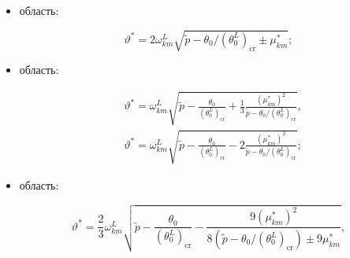 \begin{itemize}

\item[I] область:

\begin{equation}\label{eq:myl:f27}

\vartheta^*=2 \omega_{km}^L\sqrt{\widetilde{p}-{\theta_0}/{(\theta_0^L)_{\text{cr}}}\pm \mu_{km}^*};

\end{equation}



\item[II] область:



\begin{equation}\label{eq:myl:f28}

\begin{split}

& \vartheta^*=\omega_{km}^L\sqrt{\widetilde{p}-\frac{\theta_0}{(\theta_0^L)_{\text{cr}}}+

\frac13\frac{(\mu_{km}^*)^2}{\widetilde{p}-{ \theta_0}/{(\theta_0^L)_{\text{cr}}}}}, \\

& \vartheta^*=\omega_{km}^L\sqrt{\widetilde{p}-\frac{\theta_0}{(\theta_0^L)_{\text{cr}}}-

2 \frac{ (\mu_{km}^*)^2}{\widetilde{p}-{\theta_0}/{(\theta_0^L)_{\text{cr}}}}};

  \end{split}

\end{equation}



\item[III] область:



\begin{equation}\label{eq:myl:f29}

\vartheta^*=\frac{2}{3}\omega_{km}^L\sqrt{\widetilde{p}-\frac{\theta_0}{ (\theta_0^L)_{\text{cr}}}- 

\frac{9(\mu_{km}^*)^2}{8\left(\widetilde{p}-{\theta_0}/{(\theta_0^L)_{\text{cr}}}\right)\pm 9\mu_{km}^*}},

\end{equation}



\end{itemize}



\noindent 

